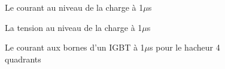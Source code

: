 \begin{figure}[htb]
\caption{Le courant au niveau de la charge à 1$\mu$s}
\label{AF_HA_CHA1}
\end{figure}



\begin{figure}[htb]
\caption{La tension au niveau de la charge à 1$\mu$s}
\label{AF_HA_CHV1}
\end{figure}

\begin{figure}[htb]
\caption{Le courant aux bornes d'un IGBT à 1$\mu$s pour le hacheur 4 quadrants}
\label{AF_HA_HAA1}
\end{figure}

